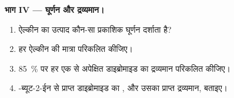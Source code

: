 \begin{problem}
\medskip
\noindent\textbf{भाग IV --- घूर्णन और द्रव्यमान।}
\begin{enumerate}[resume]
  \item {} ऐल्कीन का उत्पाद कौन-सा प्रकाशिक घूर्णन दर्शाता है?
  \item हर ऐल्कीन की मात्रा परिकलित कीजिए।
  \item \qty{85}{\percent}  पर हर एक से अपेक्षित डाइब्रोमाइड का द्रव्यमान
        परिकलित कीजिए।
  \item {}-ब्यूट-2-ईन से प्राप्त डाइब्रोमाइड का , और
        उसका प्राप्त द्रव्यमान, बताइए।
\end{enumerate}
\end{problem}
